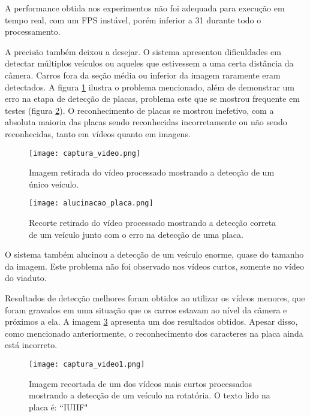 \documentclass[conference]{IEEEtran}
\begin{document}
A performance obtida nos experimentos não foi adequada para execução em tempo real, com um FPS instável, porém inferior a 31 durante todo o processamento.

A precisão também deixou a desejar. O sistema apresentou dificuldades em detectar múltiplos veículos ou aqueles que estivessem a uma certa distância da câmera.
Carros fora da seção média ou inferior da imagem raramente eram detectados.
A figura \ref{fig:carro_longe} ilustra o problema mencionado, além de demonstrar um erro na etapa de detecção de placas, problema este que se mostrou frequente em testes (figura \ref{fig:alucinacao_placa}).
O reconhecimento de placas se mostrou inefetivo, com a absoluta maioria das placas sendo reconhecidas incorretamente ou não sendo reconhecidas, tanto em vídeos quanto em imagens.

\begin{figure}
    \centering
    \texttt{[image: captura\_video.png]}
    \caption{Imagem retirada do vídeo processado mostrando a detecção de um único veículo.}
    \label{fig:carro_longe}
\end{figure}

\begin{figure}
    \centering
    \texttt{[image: alucinacao\_placa.png]}
    \caption{Recorte retirado do vídeo processado mostrando a detecção correta de um veículo junto com o erro na detecção de uma placa.}
    \label{fig:alucinacao_placa}
\end{figure}

O sistema também alucinou a detecção de um veículo enorme, quase do tamanho da imagem. Este problema não foi observado nos vídeos curtos, somente no vídeo do viaduto.

Resultados de detecção melhores foram obtidos ao utilizar os vídeos menores, que foram gravados em uma situação que os carros estavam ao nível da câmera e próximos a ela.
A imagem \ref{fig:carro_perto} apresenta um dos resultados obtidos.
Apesar disso, como mencionado anteriormente, o reconhecimento dos caracteres na placa ainda está incorreto.

\begin{figure}
    \centering
    \texttt{[image: captura\_video1.png]}
    \caption{Imagem recortada de um dos vídeos mais curtos processados mostrando a detecção de um veículo na rotatória. O texto lido na placa é: ``IUIIF"}
    \label{fig:carro_perto}
\end{figure}
\end{document}

